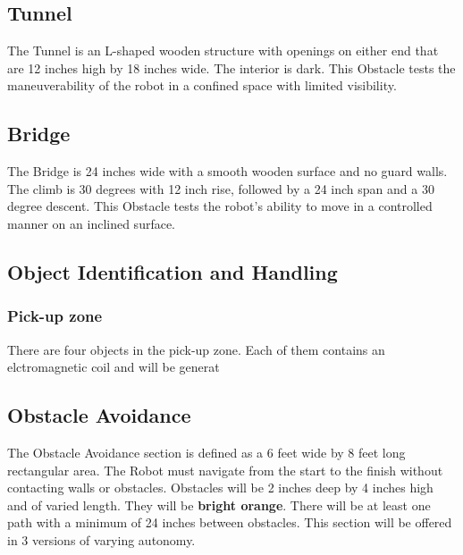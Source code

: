 \subsection{Tunnel}
The Tunnel is an L-shaped wooden structure with openings on either end that are 12 inches high by 18 inches wide. The interior is dark. This Obstacle tests the maneuverability of the robot in a confined space with limited visibility.

\subsection{Bridge}
The Bridge is 24 inches wide with a smooth wooden surface and no guard walls. The climb is 30 degrees with 12 inch rise, followed by a 24 inch span and a 30 degree descent. This Obstacle tests the robot’s ability to move in a controlled manner on an inclined surface.

\subsection{Object Identification and Handling}
	\subsubsection{Pick-up zone}
		There are four objects in the pick-up zone. Each of them contains an elctromagnetic coil and will be generat

\subsection{Obstacle Avoidance}
The Obstacle Avoidance section is defined as a 6 feet wide by 8 feet long rectangular area. The Robot must navigate from the start to the finish without contacting walls or obstacles. Obstacles will be 2 inches deep by 4 inches high and of varied length. They will be \textbf{bright orange}. There will be at least one path with a minimum of 24 inches between obstacles. This section will be offered in 3 versions of varying autonomy.

